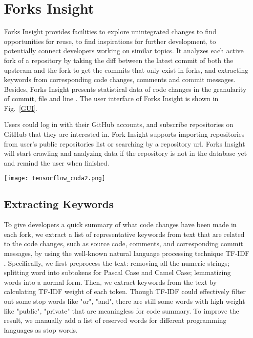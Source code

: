 \section{Forks Insight}

Forks Insight provides facilities to explore unintegrated changes to find opportunities for reuse, to find inspirations for further development, to potentially connect developers working on similar topics.
%
It analyzes each active fork of a repository by taking the diff between the latest commit of both the upstream and the fork to get the commits that only exist in forks, and extracting keywords from corresponding code changes, comments and commit messages.
%
Besides, Forks Insight presents statistical data of code changes in the granularity of commit, file and line  . The user interface of Forks Insight is shown in Fig.~\ref{GUI}.

Users could log in with their GitHub accounts, and subscribe repositories on GitHub that they are interested in. Fork Insight supports importing repositories from user's public repositories list or searching by a repository url. Forks Insight will start crawling and analyzing data if the repository is not in the database yet and remind the user when finished.

\begin{figure*}[ht]
\texttt{[image: tensorflow\_cuda2.png]}
\caption{User Interface of Forks Insight.}
\vspace{-6pt}
\label{GUI}
\end{figure*}

\subsection{Extracting Keywords}
To give developers a quick summary of what code changes have been made in each fork, we extract a list of representative keywords from text that are related to the code changes, such as source code, comments, and corresponding commit messages, by using the well-known natural language processing technique TF-IDF \cite{salton1988term}. Specifically, we first preprocess the text: removing all the numeric strings; splitting word into subtokens for Pascal Case and Camel Case; lemmatizing words into a normal form. Then, we extract keywords from the text by calculating TF-IDF weight of each token. Though TF-IDF could effectively filter out some stop words like "or", "and", there are still some words with high weight like "public", "private" that are meaningless for code summary. To improve the result, we manually add a list of  reserved words for different programming languages as stop words.

